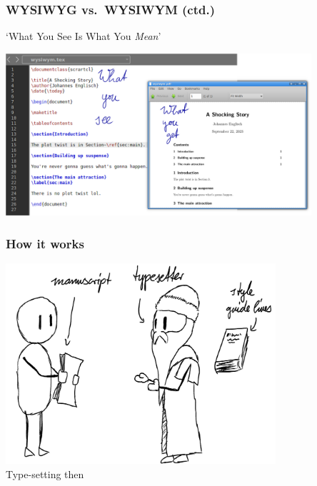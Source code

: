 \documentclass[a4paper,12pt]{beamer}
\begin{document}
\begin{frame}
  \frametitle{WYSIWYG vs.\ WYSIWYM (ctd.)}

  \begin{block}{`What You See Is What You \emph{Mean}'}
    \begin{center}
      \includegraphics[width=0.85\textwidth]{images/wysiwym.png}
    \end{center}
  \end{block}
\end{frame}

\begin{frame}
  \frametitle{How it works}

  \begin{center}
    \includegraphics[width=0.75\textwidth]{images/typesetting-then.png}\\
    Type-setting then
  \end{center}
\end{frame}
\end{document}
